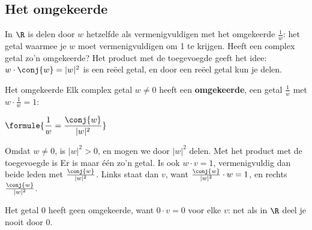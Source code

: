 \subsection{Het omgekeerde}

In $\R$ is delen door $w$ hetzelfde als vermenigvuldigen met het omgekeerde $\frac{1}{w}$: het getal waarmee je $w$ moet vermenigvuldigen om 1 te krijgen. Heeft een complex getal zo'n omgekeerde? Het product met de toegevoegde geeft het idee: $w \cdot \conj{w} = |w|^2$ is een reëel getal, en door een reëel getal kun je delen.

\begin{theorie}
\begin{stelling}{Het omgekeerde}
Elk complex getal $w \neq 0$ heeft een \textbf{\textcolor{accent}{omgekeerde}}, een getal $\frac{1}{w}$ met $w \cdot \frac{1}{w} = 1$:

\vspace{1mm}
\qquad $\formule{\dfrac{1}{w} = \dfrac{\conj{w}}{|w|^2}}$
\end{stelling}

\begin{bewijs}
Omdat $w \neq 0$, is $|w|^2 > 0$, en mogen we door $|w|^2$ delen. Met het product met de toegevoegde is
Er is maar één zo'n getal. Is ook $w \cdot v = 1$, vermenigvuldig dan beide leden met $\frac{\conj{w}}{|w|^2}$. Links staat dan $v$, want $\frac{\conj{w}}{|w|^2} \cdot w = 1$, en rechts $\frac{\conj{w}}{|w|^2}$.
\end{bewijs}
\end{theorie}

Het getal 0 heeft geen omgekeerde, want $0 \cdot v = 0$ voor elke $v$: net als in $\R$ deel je nooit door 0.



